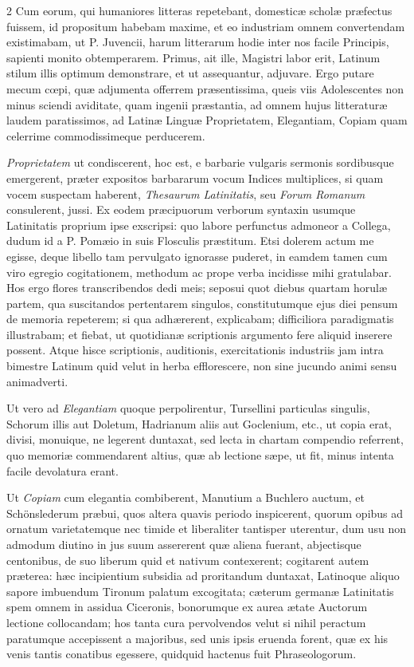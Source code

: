 \thispagestyle{plain}

\begin{multicols}{2}
Cum eorum, qui humaniores litteras repetebant, domesticæ scholæ præfectus fuissem, id propositum habebam maxime, et eo industriam omnem convertendam existimabam, ut P. Juvencii, harum litterarum hodie inter nos facile Principis, sapienti monito obtemperarem. Primus, ait ille, Magistri labor erit, Latinum stilum illis optimum demonstrare, et ut assequantur, adjuvare. Ergo putare mecum cœpi, quæ adjumenta offerrem præsentissima, queis viis Adolescentes non minus sciendi aviditate, quam ingenii præstantia, ad omnem hujus litteraturæ laudem paratissimos, ad Latinæ Linguæ Proprietatem, Elegantiam, Copiam quam celerrime commodissimeque perducerem.

\textit{Proprietatem} ut condiscerent, hoc est, e barbarie vulgaris sermonis sordibusque emergerent, præter expositos barbararum vocum Indices multiplices, si quam vocem suspectam haberent, \textit{Thesaurum Latinitatis}, seu \textit{Forum Romanum} consulerent, jussi. Ex eodem præcipuorum verborum syntaxin usumque Latinitatis proprium ipse exscripsi: quo labore perfunctus admoneor a Collega, dudum id a P. Pomæio in suis Flosculis præstitum. Etsi dolerem actum me egisse, deque libello tam pervulgato ignorasse puderet, in eamdem tamen cum viro egregio cogitationem, methodum ac prope verba incidisse mihi gratulabar. Hos ergo flores transcribendos dedi meis; seposui quot diebus quartam horulæ partem, qua suscitandos pertentarem singulos, constitutumque ejus diei pensum de memoria repeterem; si qua adhærerent, explicabam; difficiliora paradigmatis illustrabam; et fiebat, ut quotidianæ scriptionis argumento fere aliquid inserere possent. Atque hisce scriptionis, auditionis, exercitationis industriis jam intra bimestre Latinum quid velut in herba efflorescere, non sine jucundo animi sensu animadverti.

Ut vero ad \textit{Elegantiam} quoque perpolirentur, Tursellini particulas singulis, Schorum illis aut Doletum, Hadrianum aliis aut Goclenium, etc., ut copia erat, divisi, monuique, ne legerent duntaxat, sed lecta in chartam compendio referrent, quo memoriæ commendarent altius, quæ ab lectione sæpe, ut fit, minus intenta facile devolatura erant.

Ut \textit{Copiam} cum elegantia combiberent, Manutium a Buchlero auctum, et Schönslederum præbui, quos altera quavis periodo inspicerent, quorum opibus ad ornatum varietatemque nec timide et liberaliter tantisper uterentur, dum usu non admodum diutino in jus suum assererent quæ aliena fuerant, abjectisque centonibus, de suo liberum quid et nativum contexerent; cogitarent autem præterea: hæc incipientium subsidia ad proritandum duntaxat, Latinoque aliquo sapore imbuendum Tironum palatum excogitata; cæterum germanæ Latinitatis spem omnem in assidua Ciceronis, bonorumque ex aurea ætate Auctorum lectione collocandam; hos tanta cura pervolvendos velut si nihil peractum paratumque accepissent a majoribus, sed unis ipsis eruenda forent, quæ ex his venis tantis conatibus egessere, quidquid hactenus fuit Phraseologorum.


\end{multicols}
